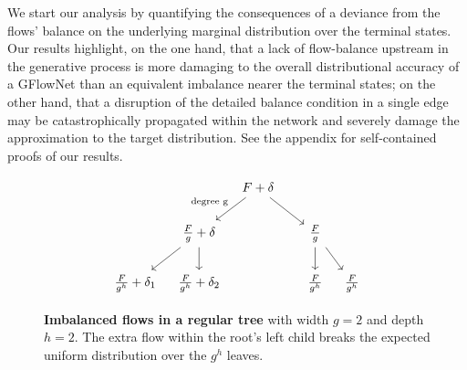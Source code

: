 
We start our analysis by quantifying the consequences of a deviance from the flows' balance on the underlying marginal distribution over the terminal states. Our results highlight, on the one hand, that a lack of flow-balance upstream in the generative process is more damaging to the overall distributional accuracy of a GFlowNet than an equivalent imbalance nearer the terminal states; on the other hand, that a disruption of the detailed balance condition in a single edge may be catastrophically propagated within the network and severely damage the approximation to the target distribution. See the appendix for self-contained proofs of our results. 

\begin{figure}[t]
    \center 
    \def\spacing{-15pt}
\[\begin{tikzcd}
	&[\spacing]&[\spacing] {F+\delta} \\
	&[\spacing] {\frac{F}{g}+\delta} &[\spacing]&[\spacing]&[\spacing] {\frac{F}{g}} \\
    {\frac{F}{g^h}+\delta_1} &[\spacing] {\frac{F}{g^h}+\delta_2} &[\spacing]&[\spacing] %
    &[\spacing] {\frac{F}{g^h}} &[\spacing] {\frac{F}{g^h}} %
    \arrow["{\text{degree g}}", swap, from=1-3, to=2-2]
	\arrow[from=1-3, to=2-5]
	\arrow[from=2-5, to=3-6]
	\arrow[from=2-5, to=3-5]
	\arrow[from=2-2, to=3-1]
	\arrow[from=2-2, to=3-2] 
\end{tikzcd}\]
\caption{\textbf{Imbalanced flows in a regular tree} with width $g = 2$ and depth $h = 2$. The extra flow within the root's left child breaks the expected uniform distribution over the $g^{h}$ leaves.}
    \label{fig:a} 
\end{figure}



